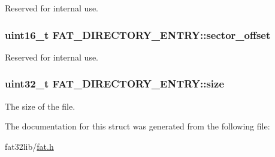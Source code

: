 Reserved for internal use.

\hypertarget{struct_f_a_t___d_i_r_e_c_t_o_r_y___e_n_t_r_y_ad756694bfe026279262fb77eb5148cd0}{
\subsubsection[{sector\-\_\-offset}]{\setlength{\rightskip}{0pt plus 5cm}uint16\-\_\-t F\-A\-T\-\_\-\-D\-I\-R\-E\-C\-T\-O\-R\-Y\-\_\-\-E\-N\-T\-R\-Y\-::sector\-\_\-offset}}\label{struct_f_a_t___d_i_r_e_c_t_o_r_y___e_n_t_r_y_ad756694bfe026279262fb77eb5148cd0}


Reserved for internal use.

\hypertarget{struct_f_a_t___d_i_r_e_c_t_o_r_y___e_n_t_r_y_afad000dca462c9f075683b297b956b50}{
\subsubsection[{size}]{\setlength{\rightskip}{0pt plus 5cm}uint32\-\_\-t F\-A\-T\-\_\-\-D\-I\-R\-E\-C\-T\-O\-R\-Y\-\_\-\-E\-N\-T\-R\-Y\-::size}}\label{struct_f_a_t___d_i_r_e_c_t_o_r_y___e_n_t_r_y_afad000dca462c9f075683b297b956b50}


The size of the file.



The documentation for this struct was generated from the following file\-:\begin{DoxyCompactItemize}
\item 
fat32lib/\hyperlink{fat_8h}{fat.\-h}\end{DoxyCompactItemize}
